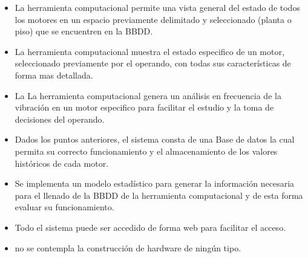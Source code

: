 	\begin{itemize}
		\item La herramienta computacional permite una vista general del estado de todos los motores en un espacio previamente delimitado y seleccionado (planta o piso) que se encuentren en la BBDD.

		\item La herramienta computacional muestra el estado especifico de un motor, seleccionado previamente por el operando, con todas sus características de forma mas detallada. 

		\item La La herramienta computacional genera un análisis en frecuencia de la vibración en un motor especifico para facilitar el estudio y la toma de decisiones del operando.

		\item Dados los puntos anteriores, el sistema consta de una Base de datos la cual permita su correcto funcionamiento y el almacenamiento de los valores históricos de cada motor.

		\item Se implementa un modelo estadístico para generar la información necesaria para el llenado de la BBDD  de la herramienta computacional y de esta forma evaluar su funcionamiento.

		\item Todo el sistema puede ser accedido de forma web para facilitar el acceso.

		\item no se contempla la construcción de hardware de ningún tipo.


	\end{itemize}